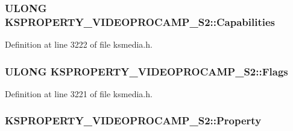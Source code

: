 \subsubsection[{\texorpdfstring{Capabilities}{Capabilities}}]{\setlength{\rightskip}{0pt plus 5cm}U\+L\+O\+NG K\+S\+P\+R\+O\+P\+E\+R\+T\+Y\+\_\+\+V\+I\+D\+E\+O\+P\+R\+O\+C\+A\+M\+P\+\_\+\+S2\+::\+Capabilities}\hypertarget{struct_k_s_p_r_o_p_e_r_t_y___v_i_d_e_o_p_r_o_c_a_m_p___s2_ac11907cf52b3ed10c175333059615898}{}\label{struct_k_s_p_r_o_p_e_r_t_y___v_i_d_e_o_p_r_o_c_a_m_p___s2_ac11907cf52b3ed10c175333059615898}


Definition at line 3222 of file ksmedia.\+h.

\subsubsection[{\texorpdfstring{Flags}{Flags}}]{\setlength{\rightskip}{0pt plus 5cm}U\+L\+O\+NG K\+S\+P\+R\+O\+P\+E\+R\+T\+Y\+\_\+\+V\+I\+D\+E\+O\+P\+R\+O\+C\+A\+M\+P\+\_\+\+S2\+::\+Flags}\hypertarget{struct_k_s_p_r_o_p_e_r_t_y___v_i_d_e_o_p_r_o_c_a_m_p___s2_ab653f70f0c78d4cbda9b10708728907b}{}\label{struct_k_s_p_r_o_p_e_r_t_y___v_i_d_e_o_p_r_o_c_a_m_p___s2_ab653f70f0c78d4cbda9b10708728907b}


Definition at line 3221 of file ksmedia.\+h.

\subsubsection[{\texorpdfstring{Property}{Property}}]{ K\+S\+P\+R\+O\+P\+E\+R\+T\+Y\+\_\+\+V\+I\+D\+E\+O\+P\+R\+O\+C\+A\+M\+P\+\_\+\+S2\+::\+Property}\hypertarget{struct_k_s_p_r_o_p_e_r_t_y___v_i_d_e_o_p_r_o_c_a_m_p___s2_a831273d85d971e599ee86b7e068ba804}{}\label{struct_k_s_p_r_o_p_e_r_t_y___v_i_d_e_o_p_r_o_c_a_m_p___s2_a831273d85d971e599ee86b7e068ba804}


